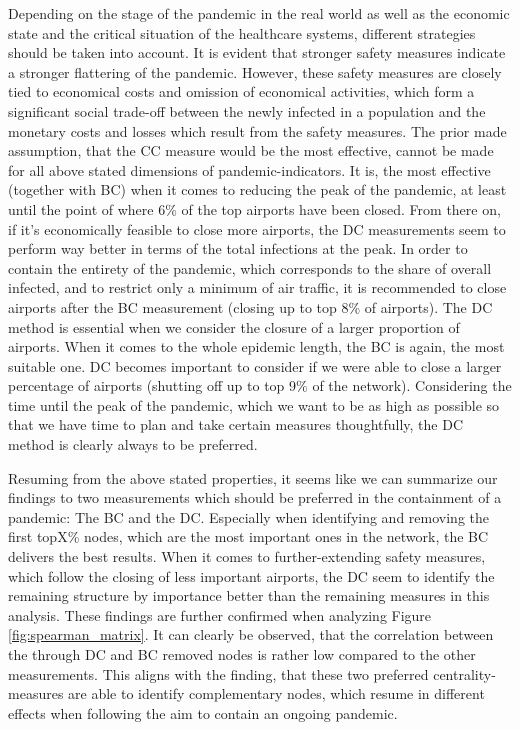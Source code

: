 \documentclass{Template_resources/netsci-project}
\begin{document}
Depending on the stage of the pandemic in the real world as well as the economic state and the critical situation of the healthcare systems, different strategies should be taken into account. It is evident that stronger safety measures indicate a stronger flattering of the pandemic. However, these safety measures are closely tied to economical costs and omission of economical activities, which form a significant social trade-off between the newly infected in a population and the monetary costs and losses which result from the safety measures. 
The prior made assumption, that the CC measure would be the most effective, cannot be made for all above stated dimensions of pandemic-indicators. It is, the most effective (together with BC) when it comes to reducing the peak of the pandemic, at least until the point of where 6\% of the top airports have been closed. From there on, if it's economically feasible to close more airports, the DC measurements seem to perform way better in terms of the total infections at the peak. 
In order to contain the entirety of the pandemic, which corresponds to the share of overall infected, and to restrict only a minimum of air traffic, it is recommended to close airports after the BC measurement (closing up to top 8\% of airports). The DC method is essential when we consider the closure of a larger proportion of airports. 
When it comes to the whole epidemic length, the BC is again, the most suitable one. DC becomes important to consider if we were able to close a larger percentage of airports (shutting off up to top 9\% of the network).
Considering the time until the peak of the pandemic, which we want to be as high as possible so that we have time to plan and take certain measures thoughtfully, the DC method is clearly always to be preferred.

Resuming from the above stated properties, it seems like we can summarize our findings to two measurements which should be preferred in the containment of a pandemic: The BC and the DC. Especially when identifying and removing the first topX\% nodes, which are the most important ones in the network, the BC delivers the best results. When it comes to further-extending safety measures, which follow the closing of less important airports, the DC seem to identify the remaining structure by importance better than the remaining measures in this analysis.
These findings are further confirmed when analyzing Figure \ref{fig:spearman_matrix}. It can clearly be observed, that the correlation between the through DC and BC removed nodes is rather low compared to the other measurements. This aligns with the finding, that these two preferred centrality-measures are able to identify complementary nodes, which resume in different effects when following the aim to contain an ongoing pandemic. 
\end{document}

